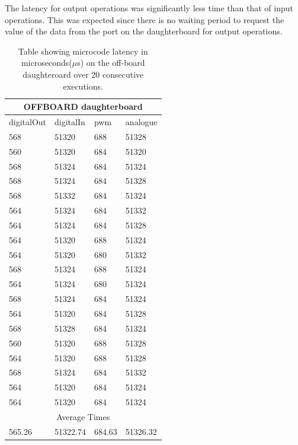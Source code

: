 The latency for output operations was significantly less time than that of input operations. This was expected since there is no waiting period to request the value of the data from the port on the daughterboard for output operations.  

\begin{table}[H]
	\centering
	\caption{Table showing microcode latency in microseconds($\mu$s) on the off-board daughteroard over 20 consecutive executions.}
	
	\begin{tabular}{|l|l|l|l|}
	\toprule
 \multicolumn{4}{c}{\textbf{OFFBOARD daughterboard}} \\\hline
digitalOut & digitalIn & pwm & analogue\\\hline
568 & 51320 & 688 & 51328\\\hline
560 & 51320 & 684 & 51320\\\hline
568 & 51324 & 684 & 51324\\\hline
568 & 51324 & 684 & 51328\\\hline
568 & 51332 & 684 & 51324\\\hline
564 & 51324 & 684 & 51332\\\hline
564 & 51324 & 684 & 51328\\\hline
564 & 51320 & 688 & 51324\\\hline
564 & 51320 & 680 & 51332\\\hline
568 & 51324 & 688 & 51324\\\hline
564 & 51324 & 680 & 51324\\\hline
568 & 51324 & 684 & 51324\\\hline
564 & 51320 & 684 & 51328\\\hline
568 & 51328 & 684 & 51324\\\hline
560 & 51320 & 688 & 51328\\\hline
564 & 51320 & 688 & 51328\\\hline
568 & 51324 & 684 & 51332\\\hline
564 & 51320 & 684 & 51324\\\hline
564 & 51320 & 684 & 51324\\\hline
\multicolumn{4}{c}{Average Times} \\\hline
565.26 & 51322.74 & 684.63 & 51326.32

\end{tabular}
\end{table}

